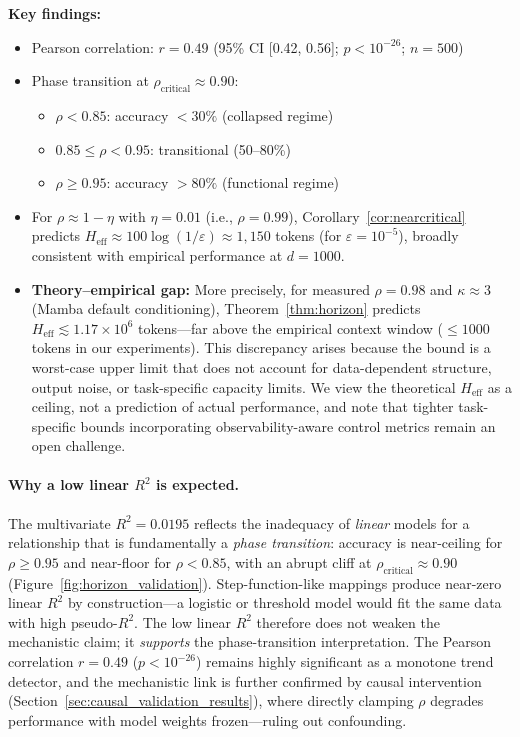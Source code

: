 \documentclass[10pt,twocolumn]{article}
\begin{document}
\textbf{Key findings:}
\begin{itemize}
\item Pearson correlation: $r = 0.49$ (95\% CI [0.42, 0.56]; $p < 10^{-26}$; $n=500$)
\item Phase transition at $\rho_{\text{critical}} \approx 0.90$:
  \begin{itemize}
  \item $\rho < 0.85$: accuracy $< 30\%$ (collapsed regime)
  \item $0.85 \le \rho < 0.95$: transitional (50--80\%)
  \item $\rho \ge 0.95$: accuracy $> 80\%$ (functional regime)
  \end{itemize}
\item For $\rho \approx 1 - \eta$ with $\eta = 0.01$ (i.e., $\rho=0.99$), Corollary~\ref{cor:nearcritical} predicts $H_{\text{eff}} \approx 100\log(1/\varepsilon) \approx 1{,}150$ tokens (for $\varepsilon=10^{-5}$), broadly consistent with empirical performance at $d=1000$.

\item \textbf{Theory--empirical gap:} More precisely, for measured $\rho=0.98$ and $\kappa \approx 3$ (Mamba default conditioning), Theorem~\ref{thm:horizon} predicts $H_{\text{eff}} \lesssim 1.17 \times 10^6$ tokens---far above the empirical context window ($\le 1000$ tokens in our experiments). This discrepancy arises because the bound is a worst-case upper limit that does not account for data-dependent structure, output noise, or task-specific capacity limits. We view the theoretical $H_{\text{eff}}$ as a ceiling, not a prediction of actual performance, and note that tighter task-specific bounds incorporating observability-aware control metrics remain an open challenge.
\end{itemize}

\paragraph{Why a low linear $R^2$ is expected.}
The multivariate $R^2 = 0.0195$ reflects the inadequacy of \emph{linear} models for a relationship that is fundamentally a \emph{phase transition}: accuracy is near-ceiling for $\rho \ge 0.95$ and near-floor for $\rho < 0.85$, with an abrupt cliff at $\rho_{\text{critical}} \approx 0.90$ (Figure~\ref{fig:horizon_validation}). Step-function-like mappings produce near-zero linear $R^2$ by construction---a logistic or threshold model would fit the same data with high pseudo-$R^2$. The low linear $R^2$ therefore does not weaken the mechanistic claim; it \emph{supports} the phase-transition interpretation. The Pearson correlation $r = 0.49$ ($p < 10^{-26}$) remains highly significant as a monotone trend detector, and the mechanistic link is further confirmed by causal intervention (Section~\ref{sec:causal_validation_results}), where directly clamping $\rho$ degrades performance with model weights frozen---ruling out confounding.
\end{document}
